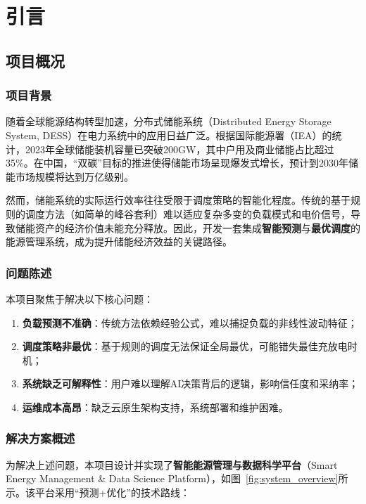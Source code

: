 \chapter{引言}

\section{项目概况}

\subsection{项目背景}

随着全球能源结构转型加速，分布式储能系统（Distributed Energy Storage System, DESS）在电力系统中的应用日益广泛\cite{divya2009battery}。根据国际能源署（IEA）的统计，2023年全球储能装机容量已突破200GW，其中户用及商业储能占比超过35\%。在中国，``双碳''目标的推进使得储能市场呈现爆发式增长，预计到2030年储能市场规模将达到万亿级别。

然而，储能系统的实际运行效率往往受限于调度策略的智能化程度。传统的基于规则的调度方法（如简单的峰谷套利）难以适应复杂多变的负载模式和电价信号，导致储能资产的经济价值未能充分释放。因此，开发一套集成\textbf{智能预测}与\textbf{最优调度}的能源管理系统，成为提升储能经济效益的关键路径\cite{luo2015overview}。

\subsection{问题陈述}

本项目聚焦于解决以下核心问题：

\begin{enumerate}
    \item \textbf{负载预测不准确}：传统方法依赖经验公式，难以捕捉负载的非线性波动特征；
    \item \textbf{调度策略非最优}：基于规则的调度无法保证全局最优，可能错失最佳充放电时机；
    \item \textbf{系统缺乏可解释性}：用户难以理解AI决策背后的逻辑，影响信任度和采纳率；
    \item \textbf{运维成本高昂}：缺乏云原生架构支持，系统部署和维护困难。
\end{enumerate}

\subsection{解决方案概述}

为解决上述问题，本项目设计并实现了\textbf{智能能源管理与数据科学平台}（Smart Energy Management \& Data Science Platform），如图~\ref{fig:system_overview}所示。该平台采用``预测+优化''的技术路线：

